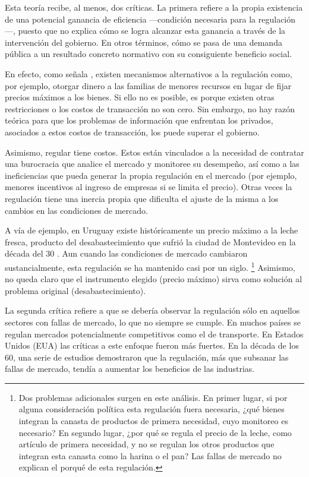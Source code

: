 \documentclass[
  12pt,
  spanish,
]{book}
\begin{document}
Esta teoría recibe, al menos, dos críticas. La primera refiere a la
propia existencia de una potencial ganancia de eficiencia ---condición
necesaria para la regulación---, puesto que no explica cómo se logra
alcanzar esta ganancia a través de la intervención del gobierno. En
otros términos, cómo se pasa de una demanda pública a un resultado
concreto normativo con su consiguiente beneficio social.

En efecto, como señala \citet{Noll1989}, existen mecanismos alternativos
a la regulación como, por ejemplo, otorgar dinero a las familias de
menores recursos en lugar de fijar precios máximos a los bienes. Si ello
no es posible, es porque existen otras restricciones o los costos de
transacción no son cero. Sin embargo, no hay razón teórica para que los
problemas de información que enfrentan los privados, asociados a estos
costos de transacción, los puede superar el gobierno.

Asimismo, regular tiene costos. Estos están vinculados a la necesidad de
contratar una burocracia que analice el mercado y monitoree su
desempeño, así como a las ineficiencias que pueda generar la propia
regulación en el mercado (por ejemplo, menores incentivos al ingreso de
empresas si se limita el precio). Otras veces la regulación tiene una
inercia propia que dificulta el ajuste de la misma a los cambios en las
condiciones de mercado.

A vía de ejemplo, en Uruguay existe históricamente un precio máximo a la
leche fresca, producto del desabastecimiento que sufrió la ciudad de
Montevideo en la década del 30 \citep{Marti2013}. Aun cuando las
condiciones de mercado cambiaron sustancialmente, esta regulación se ha
mantenido casi por un siglo. \footnote{Dos problemas adicionales surgen
  en este análisis. En primer lugar, si por alguna consideración
  política esta regulación fuera necesaria, ¿qué bienes integran la
  canasta de productos de primera necesidad, cuyo monitoreo es
  necesario? En segundo lugar, ¿por qué se regula el precio de la leche,
  como artículo de primera necesidad, y no se regulan los otros
  productos que integran esta canasta como la harina o el pan? Las
  fallas de mercado no explican el porqué de esta regulación.} Asimismo,
no queda claro que el instrumento elegido (precio máximo) sirva como
solución al problema original (desabastecimiento).

La segunda crítica refiere a que se debería observar la regulación sólo
en aquellos sectores con fallas de mercado, lo que no siempre se cumple.
En muchos países se regulan mercados potencialmente competitivos como el
de transporte. En Estados Unidos (EUA) las críticas a este enfoque
fueron más fuertes. En la década de los 60, una serie de estudios
demostraron que la regulación, más que subsanar las fallas de mercado,
tendía a aumentar los beneficios de las industrias.
\end{document}
